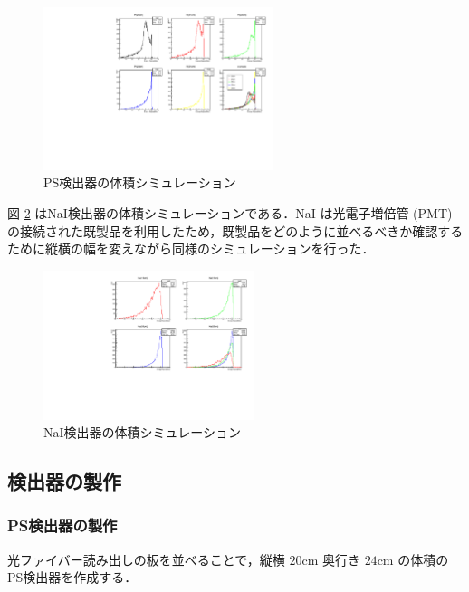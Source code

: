   \begin{figure}[H]
    \centering
    \includegraphics[width=0.6\textwidth,angle=-90]{figure/hayakawa/pl_20_24.pdf}
    \caption{PS検出器の体積シミュレーション}
    \label{PS_sim}
  \end{figure}

図 \ref{NaI_sim} はNaI検出器の体積シミュレーションである．NaI は光電子増倍管 (PMT) の接続された既製品を利用したため，既製品をどのように並べるべきか確認するために縦横の幅を変えながら同様のシミュレーションを行った．

  \begin{figure}[H]
    \centering
    \includegraphics[width=0.55\textwidth,angle=-90]{figure/hayakawa/NaI_10_20.pdf}
    \caption{NaI検出器の体積シミュレーション}
    \label{NaI_sim}
  \end{figure}

\subsection{検出器の製作}
\subsubsection{PS検出器の製作}

光ファイバー読み出しの板を並べることで，縦横 $20 \mathrm{cm}$ 奥行き $24 \mathrm{cm}$ の体積のPS検出器を作成する．

